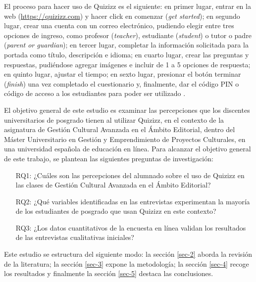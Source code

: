 \documentclass[spanish]{textolivre}
\begin{document}
El proceso para hacer uso de Quizizz es el siguiente: en primer lugar, entrar en la web (\url{https://quizizz.com}) y hacer click en comenzar (\emph{get started}); en segundo lugar, crear una cuenta con un correo electrónico, pudiendo elegir entre tres opciones de ingreso, como profesor (\emph{teacher}), estudiante (\emph{student}) o tutor o padre (\emph{parent or guardian}); en tercer lugar, completar la información solicitada para la portada como título, descripción e idioma; en cuarto lugar, crear las preguntas y respuestas, pudiéndose agregar imágenes e incluir de 1 a 5 opciones de respuesta; en quinto lugar, ajustar el tiempo; en sexto lugar, presionar el botón terminar (\emph{finish}) una vez completado el cuestionario y, finalmente, dar el código PIN o código de acceso a los estudiantes para poder ser utilizado \cite{bottentuit2020}.

El objetivo general de este estudio es examinar las percepciones que los discentes universitarios de posgrado tienen al utilizar Quizizz, en el contexto de la asignatura de Gestión Cultural Avanzada en el Ámbito Editorial, dentro del Máster Universitario en Gestión y Emprendimiento de Proyectos Culturales, en una universidad española de educación en línea. Para alcanzar el objetivo general de este trabajo, se plantean las siguientes preguntas de investigación:

\begin{itemize}
    \item[RQ1:] ¿Cuáles son las percepciones del alumnado sobre el uso de Quizizz en las clases de Gestión Cultural Avanzada en el Ámbito Editorial?
    \item[RQ2:] ¿Qué variables identificadas en las entrevistas experimentan la mayoría de los estudiantes de posgrado que usan Quizizz en este contexto? 
    \item[RQ3:] ¿Los datos cuantitativos de la encuesta en línea validan los resultados de las entrevistas cualitativas iniciales?
\end{itemize}

Este estudio se estructura del siguiente modo: la sección \ref{sec-2} aborda la revisión de la literatura; la sección \ref{sec-3} expone la metodología; la sección \ref{sec-4} recoge los resultados y finalmente la sección \ref{sec-5} destaca las conclusiones.
\end{document}
